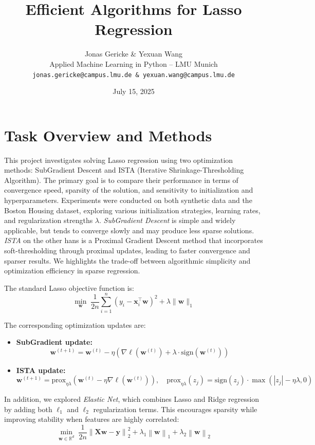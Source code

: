 \documentclass[11pt]{article}
\title{\textbf{Efficient Algorithms for Lasso Regression}}
\author{Jonas Gericke \& Yexuan Wang \\
Applied Machine Learning in Python -- LMU Munich \\
\texttt{jonas.gericke@campus.lmu.de \& yexuan.wang@campus.lmu.de}}
\date{July 15, 2025}
\begin{document}
\maketitle

\section{Task Overview and Methods}

This project investigates solving Lasso regression using two optimization methods: SubGradient Descent and ISTA (Iterative Shrinkage-Thresholding Algorithm). The primary goal is to compare their performance in terms of convergence speed, sparsity of the solution, and sensitivity to initialization and hyperparameters. Experiments were conducted on both synthetic data and the Boston Housing dataset, exploring various initialization strategies, learning rates, and regularization strengths $\lambda$.
\emph{SubGradient Descent} is simple and widely applicable, but tends to converge slowly and may produce less sparse solutions.
\emph{ISTA} on the other hans is a Proximal Gradient Descent method that incorporates soft-thresholding through proximal updates, leading to faster convergence and sparser results.
We highlights the trade-off between algorithmic simplicity and optimization efficiency in sparse regression.

The standard Lasso objective function is:
\[
    \min_{\mathbf{w}} \; \frac{1}{2n} \sum_{i=1}^n (y_i - \mathbf{x}_i^\top \mathbf{w})^2 + \lambda \|\mathbf{w}\|_1
\]

The corresponding optimization updates are:

\begin{itemize}
    \item \textbf{SubGradient update:}
          \[
              \mathbf{w}^{(t+1)} = \mathbf{w}^{(t)} - \eta \left( \nabla \ell(\mathbf{w}^{(t)}) + \lambda \cdot \text{sign}(\mathbf{w}^{(t)}) \right)
          \]

    \item \textbf{ISTA update:}
          \[
              \mathbf{w}^{(t+1)} = \text{prox}_{\eta \lambda} \left( \mathbf{w}^{(t)} - \eta \nabla \ell(\mathbf{w}^{(t)}) \right), \quad
              \text{prox}_{\eta \lambda}(z_j) = \text{sign}(z_j) \cdot \max(|z_j| - \eta \lambda, 0)
          \]

\end{itemize}

\vspace{1em}
In addition, we explored \emph{Elastic Net}, which combines Lasso and Ridge regression by adding both $\ell_1$ and $\ell_2$ regularization terms. This encourages sparsity while improving stability when features are highly correlated:
\[
    \min_{\mathbf{w} \in \mathbb{R}^d} \; \frac{1}{2n} \left\| \mathbf{Xw} - \mathbf{y} \right\|_2^2 + \lambda_1 \left\| \mathbf{w} \right\|_1 + \lambda_2 \left\| \mathbf{w} \right\|_2
\]
\end{document}
